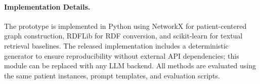 \paragraph{Implementation Details.}
The prototype is implemented in Python using NetworkX for patient-centered graph construction, RDFLib for RDF conversion, and scikit-learn for textual retrieval baselines. The released implementation includes a deterministic generator to ensure reproducibility without external API dependencies; this module can be replaced with any LLM backend. All methods are evaluated using the same patient instances, prompt templates, and evaluation scripts.
